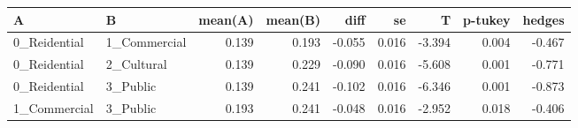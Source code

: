 \begin{tabular}{llrrrrrrr}
\toprule
            A &             B &  mean(A) &  mean(B) &   diff &     se &      T &  p-tukey &  hedges \\
\midrule
 0\_Reidential &  1\_Commercial &    0.139 &    0.193 & -0.055 &  0.016 & -3.394 &    0.004 &  -0.467 \\
 0\_Reidential &    2\_Cultural &    0.139 &    0.229 & -0.090 &  0.016 & -5.608 &    0.001 &  -0.771 \\
 0\_Reidential &      3\_Public &    0.139 &    0.241 & -0.102 &  0.016 & -6.346 &    0.001 &  -0.873 \\
 1\_Commercial &      3\_Public &    0.193 &    0.241 & -0.048 &  0.016 & -2.952 &    0.018 &  -0.406 \\
\bottomrule
\end{tabular}
